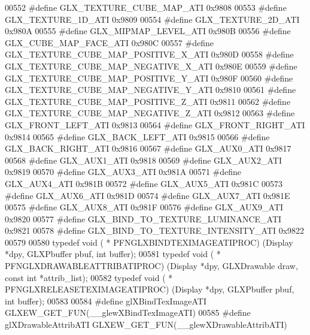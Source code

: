 \begin{DoxyCode}
00552 \textcolor{preprocessor}{#define GLX\_TEXTURE\_CUBE\_MAP\_ATI 0x9808}
00553 \textcolor{preprocessor}{#define GLX\_TEXTURE\_1D\_ATI 0x9809}
00554 \textcolor{preprocessor}{#define GLX\_TEXTURE\_2D\_ATI 0x980A}
00555 \textcolor{preprocessor}{#define GLX\_MIPMAP\_LEVEL\_ATI 0x980B}
00556 \textcolor{preprocessor}{#define GLX\_CUBE\_MAP\_FACE\_ATI 0x980C}
00557 \textcolor{preprocessor}{#define GLX\_TEXTURE\_CUBE\_MAP\_POSITIVE\_X\_ATI 0x980D}
00558 \textcolor{preprocessor}{#define GLX\_TEXTURE\_CUBE\_MAP\_NEGATIVE\_X\_ATI 0x980E}
00559 \textcolor{preprocessor}{#define GLX\_TEXTURE\_CUBE\_MAP\_POSITIVE\_Y\_ATI 0x980F}
00560 \textcolor{preprocessor}{#define GLX\_TEXTURE\_CUBE\_MAP\_NEGATIVE\_Y\_ATI 0x9810}
00561 \textcolor{preprocessor}{#define GLX\_TEXTURE\_CUBE\_MAP\_POSITIVE\_Z\_ATI 0x9811}
00562 \textcolor{preprocessor}{#define GLX\_TEXTURE\_CUBE\_MAP\_NEGATIVE\_Z\_ATI 0x9812}
00563 \textcolor{preprocessor}{#define GLX\_FRONT\_LEFT\_ATI 0x9813}
00564 \textcolor{preprocessor}{#define GLX\_FRONT\_RIGHT\_ATI 0x9814}
00565 \textcolor{preprocessor}{#define GLX\_BACK\_LEFT\_ATI 0x9815}
00566 \textcolor{preprocessor}{#define GLX\_BACK\_RIGHT\_ATI 0x9816}
00567 \textcolor{preprocessor}{#define GLX\_AUX0\_ATI 0x9817}
00568 \textcolor{preprocessor}{#define GLX\_AUX1\_ATI 0x9818}
00569 \textcolor{preprocessor}{#define GLX\_AUX2\_ATI 0x9819}
00570 \textcolor{preprocessor}{#define GLX\_AUX3\_ATI 0x981A}
00571 \textcolor{preprocessor}{#define GLX\_AUX4\_ATI 0x981B}
00572 \textcolor{preprocessor}{#define GLX\_AUX5\_ATI 0x981C}
00573 \textcolor{preprocessor}{#define GLX\_AUX6\_ATI 0x981D}
00574 \textcolor{preprocessor}{#define GLX\_AUX7\_ATI 0x981E}
00575 \textcolor{preprocessor}{#define GLX\_AUX8\_ATI 0x981F}
00576 \textcolor{preprocessor}{#define GLX\_AUX9\_ATI 0x9820}
00577 \textcolor{preprocessor}{#define GLX\_BIND\_TO\_TEXTURE\_LUMINANCE\_ATI 0x9821}
00578 \textcolor{preprocessor}{#define GLX\_BIND\_TO\_TEXTURE\_INTENSITY\_ATI 0x9822}
00579 
00580 \textcolor{keyword}{typedef} void ( * PFNGLXBINDTEXIMAGEATIPROC) (Display *dpy, GLXPbuffer pbuf, \textcolor{keywordtype}{int} 
      buffer);
00581 \textcolor{keyword}{typedef} void ( * PFNGLXDRAWABLEATTRIBATIPROC) (Display *dpy, GLXDrawable draw, \textcolor{keyword}{const} \textcolor{keywordtype}{int} *attrib\_list);
00582 \textcolor{keyword}{typedef} void ( * PFNGLXRELEASETEXIMAGEATIPROC) (Display *dpy, GLXPbuffer pbuf, \textcolor{keywordtype}{int} 
      buffer);
00583 
00584 \textcolor{preprocessor}{#define glXBindTexImageATI GLXEW\_GET\_FUN(\_\_glewXBindTexImageATI)}
00585 \textcolor{preprocessor}{#define glXDrawableAttribATI GLXEW\_GET\_FUN(\_\_glewXDrawableAttribATI)}

\end{DoxyCode}
